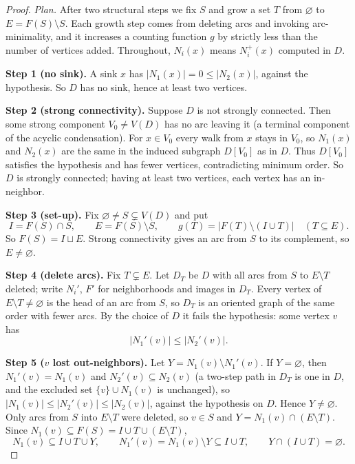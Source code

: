 \documentclass[11pt]{article}
\theoremstyle{remark}
\newcommand{\abs}[1]{\lvert #1\rvert}
\newcommand{\step}[1]{\par\smallskip\noindent\textbf{Step #1.}}
\begin{document}
\begin{proof}
\emph{Plan.} After two structural steps we fix $S$ and grow a set $T$ from
$\varnothing$ to $E=F(S)\setminus S$. Each growth step comes from deleting arcs
and invoking arc-minimality, and it increases a counting function $g$ by
strictly less than the number of vertices added. Throughout, $N_i(x)$ means
$N_i^+(x)$ computed in $D$.

\step{1 (no sink)} A sink $x$ has $\abs{N_1(x)}=0\le\abs{N_2(x)}$, against the
hypothesis. So $D$ has no sink, hence at least two vertices.

\step{2 (strong connectivity)} Suppose $D$ is not strongly connected. Then
some strong component $V_0\ne V(D)$ has no arc leaving it (a terminal component
of the acyclic condensation). For $x\in V_0$ every walk from $x$ stays in
$V_0$, so $N_1(x)$ and $N_2(x)$ are the same in the induced subgraph $D[V_0]$
as in $D$. Thus $D[V_0]$ satisfies the hypothesis and has fewer vertices,
contradicting minimum order. So $D$ is strongly connected; having at least two
vertices, each vertex has an in-neighbor.

\step{3 (set-up)} Fix $\varnothing\ne S\subsetneq V(D)$ and put
\[
  I=F(S)\cap S,\qquad E=F(S)\setminus S,
  \qquad g(T)=\abs{F(T)\setminus(I\cup T)}\quad(T\subseteq E).
\]
So $F(S)=I\sqcup E$. Strong connectivity gives an arc from $S$ to its
complement, so $E\ne\varnothing$.

\step{4 (delete arcs)} Fix $T\subsetneq E$. Let $D_T$ be $D$ with all arcs from
$S$ to $E\setminus T$ deleted; write $N_i'$, $F'$ for neighborhoods and images
in $D_T$. Every vertex of $E\setminus T\ne\varnothing$ is the head of an arc
from $S$, so $D_T$ is an oriented graph of the same order with fewer arcs. By
the choice of $D$ it fails the hypothesis: some vertex $v$ has
\begin{equation}\label{eq:DT-fails}
 \abs{N_1'(v)}\le\abs{N_2'(v)}.
\end{equation}

\step{5 ($v$ lost out-neighbors)} Let $Y=N_1(v)\setminus N_1'(v)$. If
$Y=\varnothing$, then $N_1'(v)=N_1(v)$ and $N_2'(v)\subseteq N_2(v)$ (a
two-step path in $D_T$ is one in $D$, and the excluded set $\{v\}\cup N_1(v)$
is unchanged), so $\abs{N_1(v)}\le\abs{N_2'(v)}\le\abs{N_2(v)}$, against the
hypothesis on $D$. Hence $Y\ne\varnothing$. Only arcs from $S$ into
$E\setminus T$ were deleted, so $v\in S$ and $Y=N_1(v)\cap(E\setminus T)$.
Since $N_1(v)\subseteq F(S)=I\cup T\cup(E\setminus T)$,
\begin{equation}\label{eq:lost}
 N_1(v)\subseteq I\cup T\cup Y,\qquad N_1'(v)=N_1(v)\setminus Y\subseteq I\cup T,
 \qquad Y\cap(I\cup T)=\varnothing.
\end{equation}


\end{proof}
\end{document}

